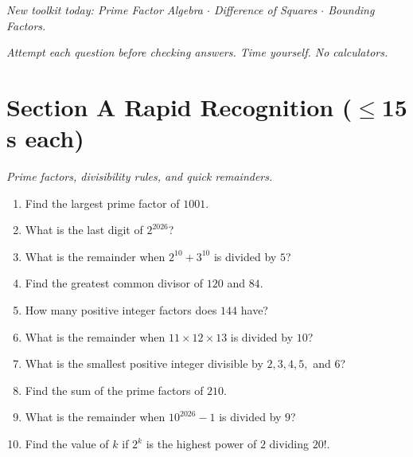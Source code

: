 \documentclass[11pt,a4paper]{article}
\begin{document}
\noindent\textit{New toolkit today: Prime Factor Algebra $\cdot$ Difference of Squares $\cdot$ Bounding Factors.}

\vspace{2pt}
\noindent\textit{Attempt each question before checking answers. Time yourself. No calculators.}

\section*{Section A \quad Rapid Recognition \hfill{\normalfont\small($\leq$15 s each)}}

\noindent\textit{Prime factors, divisibility rules, and quick remainders.}

\begin{enumerate}

\item Find the largest prime factor of $1001$.

\item What is the last digit of $2^{2026}$?

\item What is the remainder when $2^{10} + 3^{10}$ is divided by $5$?

\item Find the greatest common divisor of $120$ and $84$.

\item How many positive integer factors does $144$ have?

\item What is the remainder when $11 \times 12 \times 13$ is divided by $10$?

\item What is the smallest positive integer divisible by $2, 3, 4, 5,$ and $6$?

\item Find the sum of the prime factors of $210$.

\item What is the remainder when $10^{2026} - 1$ is divided by $9$?

\item Find the value of $k$ if $2^k$ is the highest power of $2$ dividing $20!$.

\end{enumerate}
\end{document}
